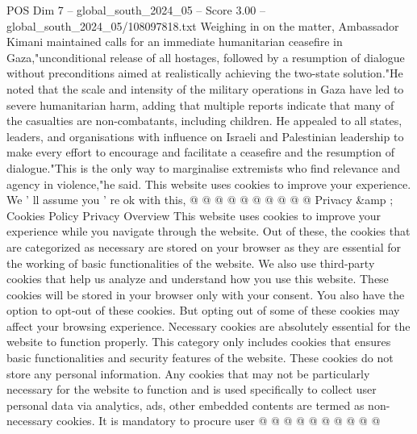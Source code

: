 \begin{textsample}{POS Dim 7 – global\_south\_2024\_05 – Score 3.00 – global\_south\_2024\_05/108097818.txt}
Weighing in on the matter, Ambassador Kimani maintained calls for an immediate humanitarian ceasefire in Gaza,"unconditional release of all hostages, followed by a resumption of dialogue without preconditions aimed at realistically achieving the two-state solution."He noted that the scale and intensity of the military operations in Gaza have led to severe humanitarian harm, adding that multiple reports indicate that many of the casualties are non-combatants, including children.
He appealed to all states, leaders, and organisations with influence on Israeli and Palestinian leadership to make every effort to encourage and facilitate a ceasefire and the resumption of dialogue."This is the only way to marginalise extremists who find relevance and agency in violence,"he said.
This website uses cookies to improve your experience.
We ' ll assume you ' re ok with this, @ @ @ @ @ @ @ @ @ @ Privacy \&amp ; Cookies Policy Privacy Overview This website uses cookies to improve your experience while you navigate through the website.
Out of these, the cookies that are categorized as necessary are stored on your browser as they are essential for the working of basic functionalities of the website.
We also use third-party cookies that help us analyze and understand how you use this website.
These cookies will be stored in your browser only with your consent.
You also have the option to opt-out of these cookies.
But opting out of some of these cookies may affect your browsing experience.
Necessary cookies are absolutely essential for the website to function properly.
This category only includes cookies that ensures basic functionalities and security features of the website.
These cookies do not store any personal information.
Any cookies that may not be particularly necessary for the website to function and is used specifically to collect user personal data via analytics, ads, other embedded contents are termed as non-necessary cookies.
It is mandatory to procure user @ @ @ @ @ @ @ @ @ @

\end{textsample}
